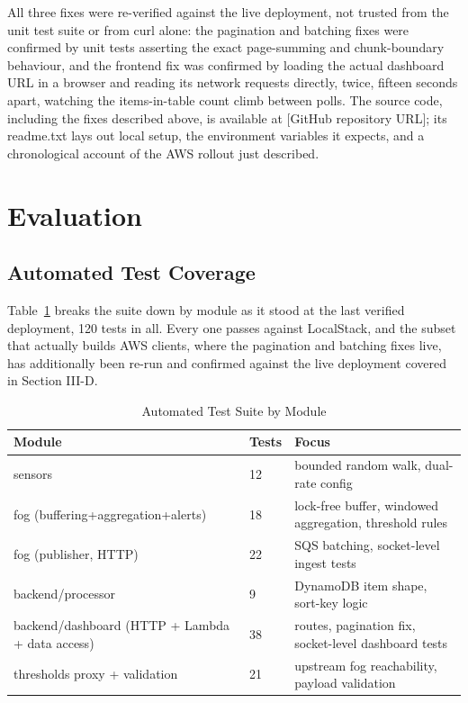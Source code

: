 \documentclass[conference]{IEEEtran}
\begin{document}
All three fixes were re-verified against the live deployment, not trusted from the unit test suite or from curl alone: the pagination and batching fixes were confirmed by unit tests asserting the exact page-summing and chunk-boundary behaviour, and the frontend fix was confirmed by loading the actual dashboard URL in a browser and reading its network requests directly, twice, fifteen seconds apart, watching the items-in-table count climb between polls. The source code, including the fixes described above, is available at [GitHub repository URL]; its readme.txt lays out local setup, the environment variables it expects, and a chronological account of the AWS rollout just described.

\section{Evaluation}

\subsection{Automated Test Coverage}
Table~\ref{tab:tests} breaks the suite down by module as it stood at the last verified deployment, 120 tests in all. Every one passes against LocalStack, and the subset that actually builds AWS clients, where the pagination and batching fixes live, has additionally been re-run and confirmed against the live deployment covered in Section III-D.

\begin{table}[!t]
\caption{Automated Test Suite by Module}
\label{tab:tests}
\centering
\footnotesize
\begin{tabular}{|p{3.3cm}|p{0.6cm}|p{3.3cm}|}
\hline
\textbf{Module} & \textbf{Tests} & \textbf{Focus} \\
\hline
sensors & 12 & bounded random walk, dual-rate config \\
\hline
fog (buffering+aggregation+alerts) & 18 & lock-free buffer, windowed aggregation, threshold rules \\
\hline
fog (publisher, HTTP) & 22 & SQS batching, socket-level ingest tests \\
\hline
backend/processor & 9 & DynamoDB item shape, sort-key logic \\
\hline
backend/dashboard (HTTP + Lambda + data access) & 38 & routes, pagination fix, socket-level dashboard tests \\
\hline
thresholds proxy + validation & 21 & upstream fog reachability, payload validation \\
\hline
\end{tabular}
\end{table}
\end{document}
